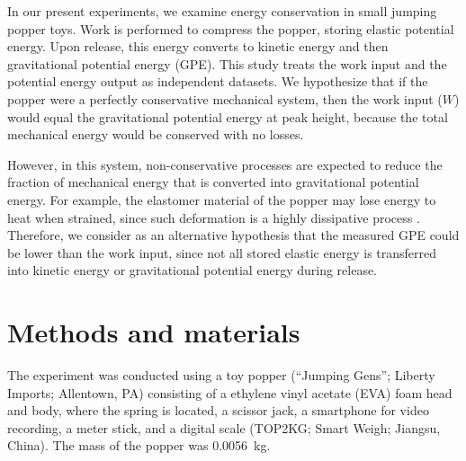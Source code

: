 \documentclass[reprint,amsmath,amssymb,aps,twoside]{revtex4-2} %
\begin{document}
In our present experiments, we examine energy conservation in small jumping popper toys. Work is performed to compress the popper, storing elastic potential energy. Upon release, this energy converts to kinetic energy and then gravitational potential energy (GPE). This study treats the work input and the potential energy output as independent datasets. We hypothesize that if the popper were a perfectly conservative mechanical system, then the work input ($W$) would equal the gravitational potential energy at peak height, because the total mechanical energy would be conserved with no losses. 

However, in this system, non-conservative processes are expected to reduce the fraction of mechanical energy that is converted into gravitational potential energy. For example, the elastomer material of the popper may lose energy to heat when strained, since such deformation is a highly dissipative process \cite{sendrowicz2022stored}. Therefore, we consider as an alternative hypothesis that the measured GPE could be lower than the work input, since not all stored elastic energy is transferred into kinetic energy or gravitational potential energy during release.





\section{Methods and materials}
The experiment was conducted using a toy popper (``Jumping Gens''; Liberty Imports; Allentown, PA) consisting of a ethylene vinyl acetate (EVA) foam head and body, where the spring is located, a scissor jack, a smartphone for video recording, a meter stick, and a digital scale (TOP2KG; Smart Weigh; Jiangsu, China). The mass of the popper was \qty{0.0056}{\kilo\gram}. 
\end{document}
